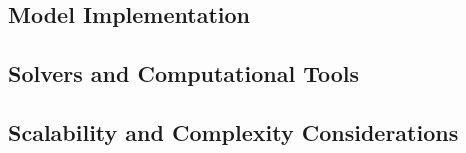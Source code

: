 \subsection*{Model Implementation}
\subsection*{Solvers and Computational Tools}
\subsection*{Scalability and Complexity Considerations}